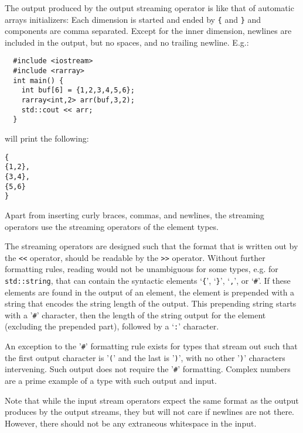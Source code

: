 \documentclass[11pt,twoside]{article}
\begin{document}
The output produced by the output streaming operator is like that of
automatic arrays initializers: Each dimension is started and ended by
\texttt{\{} and \texttt{\}} and components are comma separated.
Except for the inner dimension, newlines are included in the output,
but no spaces, and no trailing newline.
E.g.:\vspace{-9pt}
\begin{framed}\vspace{-18pt}%
\begin{verbatim}
  #include <iostream>
  #include <rarray>
  int main() {
    int buf[6] = {1,2,3,4,5,6};
    rarray<int,2> arr(buf,3,2);
    std::cout << arr;
  }
\end{verbatim}%
\vspace{-12pt}
\end{framed}\vspace{-8pt}\noindent
will print the following:
\begin{verbatim}
{
{1,2},
{3,4},
{5,6}
}
\end{verbatim}
Apart from inserting curly braces, commas, and newlines, the streaming
operators use the streaming operators of the element types. 

The streaming operators are designed such that the format that is
written out by the \texttt{<<} operator, should be readable by the
\texttt{>>} operator.  
Without further formatting rules, reading would not be unambiguous for
some types, e.g. for
\texttt{std::string}, that can contain the syntactic elements
`\texttt{\{}', `\texttt{\}}', `\texttt{,}', or `\texttt{\#}'.  If these elements are found in the output of an element, the element is prepended with a string that encodes the string length of the output. This prepending string starts with a '\texttt\#' character, then the length of the string output for the element  (excluding the prepended part), followed by a `\texttt:' character.

An exception to the '\texttt\#' formatting rule exists for types that
stream out such that the first output character is '\texttt(' and the
last is '\texttt)', with no other '\texttt)' characters
intervening. Such output does not require the '\texttt\#'
formatting. Complex numbers are a prime example of a type with such
output and input.

Note that while the input stream operators expect the same format as
the output produces by the output streams, they but will
not care if newlines are not there. However, there should not be any extraneous
whitespace in the input.
\end{document}
